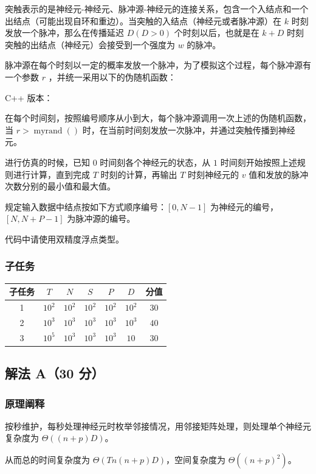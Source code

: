 			\par 突触表示的是神经元-神经元、脉冲源-神经元的连接关系，包含一个入结点和一个出结点（可能出现自环和重边）。当突触的入结点（神经元或者脉冲源）在 $k$ 时刻发放一个脉冲，那么在传播延迟 $D(D>0)$ 个时刻以后，也就是在 $k+D$ 时刻突触的出结点（神经元）会接受到一个强度为 $w$ 的脉冲。
			\par 脉冲源在每个时刻以一定的概率发放一个脉冲，为了模拟这个过程，每个脉冲源有一个参数 $r$ ，并统一采用以下的伪随机函数：
			\par C++ 版本：
			
			\par 在每个时间刻，按照编号顺序从小到大，每个脉冲源调用一次上述的伪随机函数，当 $r>\operatorname{myrand}()$ 时，在当前时间刻发放一次脉冲，并通过突触传播到神经元。
			\par 进行仿真的时候，已知 $0$ 时间刻各个神经元的状态，从 $1$ 时间刻开始按照上述规则进行计算，直到完成 $T$ 时刻的计算，再输出 $T$ 时刻神经元的 $v$ 值和发放的脉冲次数分别的最小值和最大值。
			\par 规定输入数据中结点按如下方式顺序编号：$[0,N-1]$ 为神经元的编号，$[N,N+P-1]$ 为脉冲源的编号。
			\par 代码中请使用双精度浮点类型。
		\subsubsection{子任务}
			\begin{table}[!ht]
				\centering
				\begin{tabular}{|c|c|c|c|c|c|c|}
				\hline
					子任务 & $T$ & $N$ & $S$ & $P$ & $D$ & 分值 \\ \hline
					1 & $10^2$ & $10^2$ & $10^2$ & $10^2$ & $10^2$ & $30$ \\ \hline
					2 & $10^3$ & $10^3$ & $10^3$ & $10^3$ & $10^3$ & $40$ \\ \hline
					3 & $10^5$ & $10^3$ & $10^3$ & $10^3$ & $10$ & $30$ \\ \hline
				\end{tabular}
			\end{table}
	\subsection{解法 A（30 分）}
		\subsubsection{原理阐释}
			\par 按秒维护，每秒处理神经元时枚举邻接情况，用邻接矩阵处理，则处理单个神经元复杂度为 $\Theta((n+p)D)$。
			\par 从而总的时间复杂度为 $\Theta(Tn(n+p)D)$，空间复杂度为 $\Theta((n+p)^2)$。

